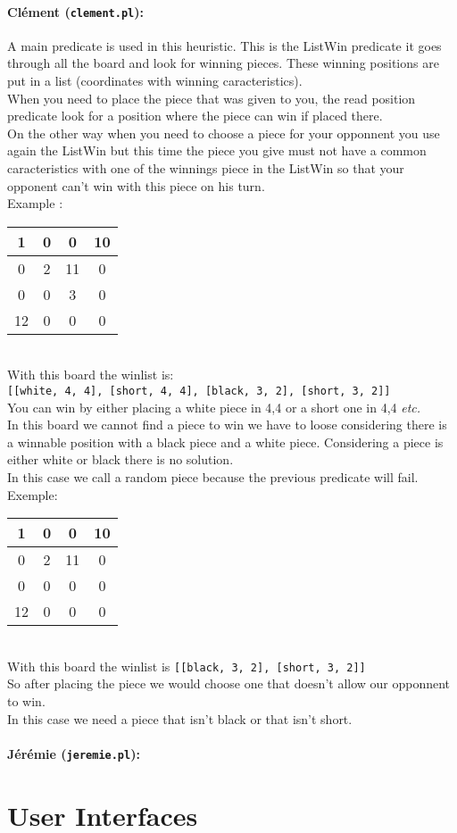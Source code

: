 \documentclass[a4paper,12pt]{article}
\newcommand{\tw}[1]{\texttt{#1}}
\newcommand{\board}[4]{
	\begin{tabular}{|c|c|c|c|} \hline
		#1 \\\hline
		#2 \\\hline
		#3 \\\hline
		#4 \\\hline
	\end{tabular}
}
\begin{document}
		\paragraph{Clément (\tw{clement.pl}):} A main predicate is used in this heuristic. This is the ListWin predicate it goes through all the board and look for winning pieces. These winning positions are put in a list (coordinates with winning caracteristics). \\
		When you need to place the piece that was given to you, the read position predicate look for a position where the piece can win if placed there. \\
		On the other way when you need to choose a piece for your opponnent you use again the ListWin but this time the piece you give must not have a common caracteristics with one of the winnings piece in the ListWin so that your opponent can't win with this piece on his turn. \\
		Example :
		\board{1 & 0 & 0 & 10}{0 & 2 & 11 & 0}{0 & 0 & 3 & 0}{12 & 0 & 0 & 0} \\
		With this board the winlist is:\\
		\tw{[[white, 4, 4], [short, 4, 4], [black, 3, 2], [short, 3, 2]]} \\
		You can win by either placing a white piece in 4,4 or a short one in 4,4 \textit{etc.}\\
		In this board we cannot find a piece to win we have to loose considering there is a winnable position with a black piece and a white piece. Considering a piece is either white or black there is no solution. \\
		In this case we call a random piece because the previous predicate will fail. \\
		Exemple: \board{1 & 0 & 0 & 10}{0 & 2 & 11 & 0}{0 & 0 & 0 & 0}{12 & 0 & 0 & 0} \\
		With this board the winlist is \tw{[[black, 3, 2], [short, 3, 2]]} \\
		So after placing the piece we would choose one that doesn't allow our opponnent to win. \\
		In this case we need a piece that isn't black or that isn't short.
		
		\paragraph{Jérémie (\tw{jeremie.pl}):}
	
	\section{User Interfaces}
\end{document}
